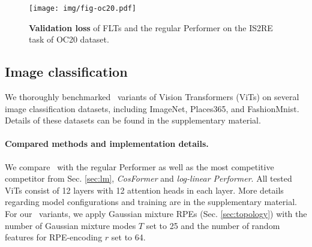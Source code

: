 \begin{figure*}[!ht]
\begin{minipage}[t]{0.51\linewidth}
    \centering
    \vspace{-43mm}
    \label{tab:oc20}
    \vspace{-1.5mm}
\end{minipage}\hfill
\begin{minipage}[t]{0.46\linewidth}
    \centering
    \texttt{[image: img/fig-oc20.pdf]}
    \vspace{-7.5mm}  
    \caption{\textbf{Validation loss} of FLTs and the regular Performer on the IS2RE task of OC20 dataset.}
    \label{fig:oc20}\vspace{-6mm}
\end{minipage}
\end{figure*}

\subsection{Image classification}
\label{sec:images}
We thoroughly benchmarked \FLT~variants of Vision Transformers (ViTs) \cite{vits} on several image classification datasets, including ImageNet, Places365, and FashionMnist. Details of these datasets can be found in the supplementary material.

\paragraph{Compared methods and implementation details.} We compare \FLT~with the regular Performer as well as the most competitive competitor from Sec. \ref{sec:lm}, \textit{CosFormer} and \textit{log-linear Performer}. All tested ViTs consist of 12 layers with 12 attention heads in each layer. More details regarding model configurations and training are in the supplementary material.
For our \FLT~variants, we apply Gaussian mixture RPEs (Sec. \ref{sec:topology}) with the number of Gaussian mixture modes $T$ set to 25 and the number of random features for RPE-encoding $r$ set to 64. %

